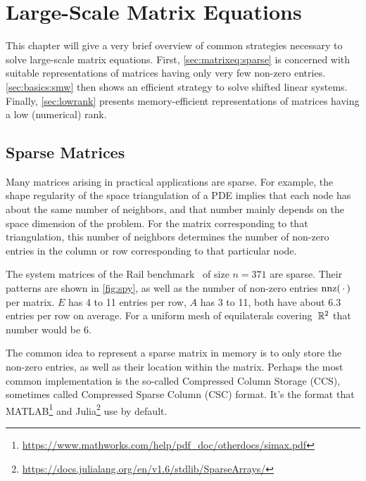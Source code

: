 \chapter{Large-Scale Matrix Equations}
\label{sec:matrixeq}

This chapter will give a very brief overview of common strategies necessary to solve large-scale matrix equations.
First, \autoref{sec:matrixeq:sparse} is concerned with suitable representations of matrices having only very few non-zero entries.
\autoref{sec:basics:smw} then shows an efficient strategy to solve shifted linear systems.
Finally, \autoref{sec:lowrank} presents memory-efficient representations of matrices having a low (numerical) rank.

\section{Sparse Matrices}
\label{sec:matrixeq:sparse}

Many matrices arising in practical applications are sparse.
For example, the shape regularity of the space triangulation of a \ac{PDE}
implies that each node has about the same number of neighbors,
and that number mainly depends on the space dimension of the problem.
For the matrix corresponding to that triangulation,
this number of neighbors determines the number of non-zero entries in the column or row corresponding to that particular node.

\begin{example}
  The system matrices of the Rail benchmark~\cite{morwiki_steel} of size $n=371$ are sparse.
  Their patterns are shown in \autoref{fig:spy}, as well as the number of non-zero entries $\nnz(\optional{})$ per matrix.
  $E$ has 4 to 11 entries per row, $A$ has 3 to 11, both have about \num{6.3} entries per row on average.
  For a uniform mesh of equilaterals covering~$\mathbb{R}^2$ that number would be \num{6}.
\end{example}

The common idea to represent a sparse matrix in memory is to only store the non-zero entries,
as well as their location within the matrix.
Perhaps the most common implementation is the so-called Compressed Column Storage (CCS),
sometimes called Compressed Sparse Column (CSC) format.
It's the format that \eg MATLAB\footnote{\url{https://www.mathworks.com/help/pdf_doc/otherdocs/simax.pdf}}
and Julia\footnote{\url{https://docs.julialang.org/en/v1.6/stdlib/SparseArrays/}} use by default.

